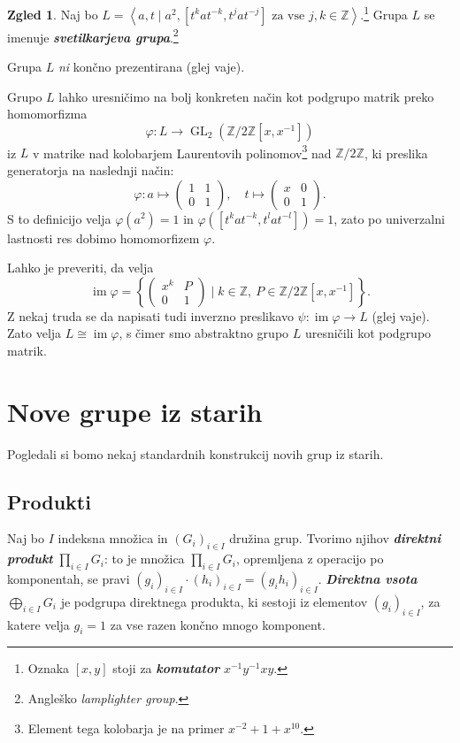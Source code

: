 \documentclass[11pt]{book}
\def\ZZ{\mathbb{Z}}
\DeclareMathOperator\image{im}
\DeclareMathOperator\GL{GL}
\def\definicija{\color{rdeca}\bf\em}
\def\literatura{\color{modra}}
\def\vaje{{\literatura (glej vaje)}}
\theoremstyle{definition}
\theoremstyle{zgled}
\newtheorem*{zgled}{Zgled}
\theoremstyle{odprtproblem}
\theoremstyle{domacanaloga}
\theoremstyle{izrek}
\begin{document}
\begin{zgled}
Naj bo $L = \left\langle a, t \mid a^2, [t^k a t^{-k}, t^j a t^{-j}] \text{ za vse $j,k \in \ZZ$} \right\rangle$.\footnote{Oznaka $[x,y]$ stoji za {\definicija komutator} $x^{-1} y^{-1} x y$.} Grupa $L$ se imenuje {\definicija svetilkarjeva grupa}.\footnote{Angleško {\em lamplighter group}.}

Grupa $L$ {\em ni} končno prezentirana \vaje.

Grupo $L$ lahko uresničimo na bolj konkreten način kot podgrupo matrik preko homomorfizma
\[
\varphi \colon L \to \GL_2(\ZZ/2\ZZ[x, x^{-1}])
\]
iz $L$ v matrike nad kolobarjem Laurentovih polinomov\footnote{Element tega kolobarja je na primer $x^{-2} + 1 + x^{10}$.} nad $\ZZ/2\ZZ$, ki preslika generatorja na naslednji način:
\[
\varphi \colon 
a \mapsto 
\begin{pmatrix}
1 & 1 \\
0 & 1
\end{pmatrix},
\quad
t \mapsto 
\begin{pmatrix}
x & 0 \\
0 & 1
\end{pmatrix}.
\]
S to definicijo velja $\varphi(a^2) = 1$ in $\varphi([t^k a t^{-k}, t^l a t^{-l}]) = 1$, zato po univerzalni lastnosti res dobimo homomorfizem $\varphi$. 

Lahko je preveriti, da velja
\[
\image \varphi = \left\{ 
\begin{pmatrix}
x^k & P \\
0 & 1
\end{pmatrix} \mid
k \in \ZZ, \ P \in \ZZ/2\ZZ[x, x^{-1}]
\right\}.
\]
Z nekaj truda se da napisati tudi inverzno preslikavo $\psi \colon \image \varphi \to L$ \vaje. Zato velja $L \cong \image \varphi$, s čimer smo abstraktno grupo $L$ uresničili kot podgrupo matrik.
\end{zgled}

\section{Nove grupe iz starih}

Pogledali si bomo nekaj standardnih konstrukcij novih grup iz starih.

\subsection{Produkti}

Naj bo $I$ indeksna množica in $(G_i)_{i \in I}$ družina grup. Tvorimo njihov {\definicija direktni produkt} $\prod_{i \in I} G_i$: to je množica $\prod_{i \in I} G_i$, opremljena z operacijo po komponentah, se pravi $(g_i)_{i \in I} \cdot (h_i)_{i \in I} = (g_i h_i)_{i \in I}$. {\definicija Direktna vsota} $\bigoplus_{i \in I} G_i$ je podgrupa direktnega produkta, ki sestoji iz elementov $(g_i)_{i \in I}$, za katere velja $g_i = 1$ za vse razen končno mnogo komponent.
\end{document}
